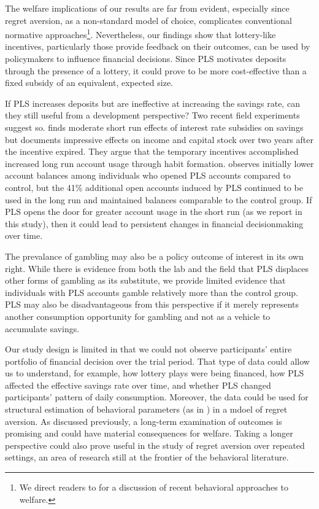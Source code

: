 \documentclass[11pt]{article}
\begin{document}
	The welfare implications of our results are far from evident, especially since regret aversion, as a non-standard model of choice, complicates conventional normative approaches\footnote{We direct readers to \textcite{bernheim_behavioral_2009} for a discussion of recent behavioral approaches to welfare.}. Nevertheless, our findings show that lottery-like incentives, particularly those provide feedback on their outcomes, can be used by policymakers to influence financial decisions. Since PLS motivates deposits through the presence of a lottery, it could prove to be more cost-effective than a fixed subsidy of an equivalent, expected size.

	If PLS increases deposits but are ineffective at increasing the savings rate, can they still useful from a development perspective? Two recent field experiments suggest so. \textcite{schaner_persistent_2018} finds moderate short run effects of interest rate subsidies on savings but documents impressive effects on income and capital stock over two years after the incentive expired. They argue that the temporary incentives accomplished increased long run account usage through habit formation. \textcite{gertler_long-term_2017} observes initially lower account balances among individuals who opened PLS accounts compared to control, but the 41\% additional open accounts induced by PLS continued to be used in the long run and maintained balances comparable to the control group. If PLS opens the door for greater account usage in the short run (as we report in this study), then it could lead to persistent changes in financial decisionmaking over time.

	The prevalance of gambling may also be a policy outcome of interest in its own right. While there is evidence from both the lab and the field that PLS displaces other forms of gambling as its substitute, we provide limited evidence that individuals with PLS accounts gamble relatively more than the control group. PLS may also be disadvantageous from this perspective if it merely represents another consumption opportunity for gambling and not as a vehicle to accumulate savings.

	Our study design is limited in that we could not observe participants' entire portfolio of financial decision over the trial period. That type of data could allow us to understand, for example, how lottery plays were being financed, how PLS affected the effective savings rate over time, and whether PLS changed participants' pattern of daily consumption. Moreover, the data could be used for structural estimation of behavioral parameters (as in \textcite{filiz-ozbay_lottery_2015}) in a mdoel of regret aversion. As discussed previously, a long-term examination of outcomes is promising and could have material consequences for welfare. Taking a longer perspective could also prove useful in the study of regret aversion over repeated settings, an area of research still at the frontier of the behavioral literature.
\end{document}
